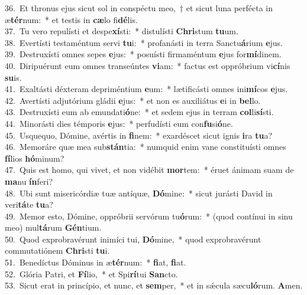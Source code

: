 {36.~}Et thronus ejus sicut sol in conspéctu meo,~† et sicut luna perfécta in æ\textbf{tér}num:~* et testis in \textbf{cæ}lo fi\textbf{dé}lis.\\
{37.~}Tu vero repulísti et despe\textbf{xí}sti:~* distulísti \textbf{Chri}stum \textbf{tu}um.\\
{38.~}Evertísti testaméntum servi \textbf{tu}i:~* profanásti in terra Sanctu\textbf{á}rium \textbf{e}jus.\\
{39.~}Destruxísti omnes sepes \textbf{e}jus:~* posuísti firmaméntum \textbf{e}jus for\textbf{mí}dinem.\\
{40.~}Diripuérunt eum omnes transeúntes \textbf{vi}am:~* factus est oppróbrium vi\textbf{cí}nis \textbf{su}is.\\
{41.~}Exaltásti déxteram depriméntium \textbf{e}um:~* lætificásti omnes ini\textbf{mí}cos \textbf{e}jus.\\
{42.~}Avertísti adjutórium gládii \textbf{e}jus:~* et non es auxiliátus \textbf{e}i in \textbf{bel}lo.\\
{43.~}Destruxísti eum ab emundati\textbf{ó}ne:~* et sedem ejus in terram \textbf{col}li\textbf{sí}sti.\\
{44.~}Minorásti dies témporis \textbf{e}jus:~* perfudísti eum con\textbf{fu}si\textbf{ó}ne.\\
{45.~}Usquequo, Dómine, avértis in \textbf{fi}nem:~* exardéscet sicut ignis \textbf{i}ra \textbf{tu}a?\\
{46.~}Memoráre quæ mea sub\textbf{stán}tia:~* numquid enim vane constituísti omnes \textbf{fí}lios \textbf{hó}minum?\\
{47.~}Quis est homo, qui vivet, et non vidébit \textbf{mor}tem:~* éruet ánimam suam de \textbf{ma}nu \textbf{ín}feri?\\
{48.~}Ubi sunt misericórdiæ tuæ antíquæ, \textbf{Dó}mine:~* sicut jurásti David in veri\textbf{tá}te \textbf{tu}a?\\
{49.~}Memor esto, Dómine, oppróbrii servórum tu\textbf{ó}rum:~* (quod contínui in sinu meo) mul\textbf{tá}rum \textbf{Gén}tium.\\
{50.~}Quod exprobravérunt inimíci tui, \textbf{Dó}mine,~* quod exprobravérunt commutatiónem \textbf{Chri}sti \textbf{tu}i.\\
{51.~}Benedíctus Dóminus in æ\textbf{tér}num:~* \textbf{fi}at, \textbf{fi}at.\\
{52.~}Glória Patri, et \textbf{Fí}lio,~* et Spi\textbf{rí}tui \textbf{San}cto.\\
{53.~}Sicut erat in princípio, et nunc, et \textbf{sem}per,~* et in sǽcula sæcu\textbf{ló}rum. \textbf{A}men.\\
